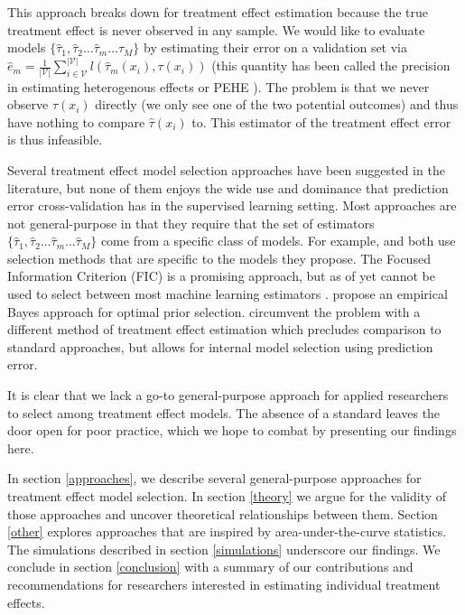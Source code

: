This approach breaks down for treatment effect estimation because the true treatment effect is never observed in any sample. We would like to evaluate models $\{\hat\tau_1, \hat\tau_2 \dots \hat \tau_m \dots \hat \tau_M\}$ by estimating their error on a validation set via $\hat e_m = \frac{1}{|\mathcal{V}|}\sum_{i \in \mathcal{V}}^{|\mathcal{V}|}  l(\hat \tau_m (x_i), \tau(x_i))$ (this quantity has been called the precision in estimating heterogenous effects or PEHE \cite{Hill2011}). The problem is that we never observe $\tau(x_i)$ directly (we only see one of the two potential outcomes) and thus have nothing to compare $\hat\tau(x_i)$ to. This estimator of the treatment effect error is thus infeasible.

Several treatment effect model selection approaches have been suggested in the literature, but none of them enjoys the wide use and dominance that prediction error cross-validation has in the supervised learning setting. Most approaches are not general-purpose in that they require that the set of estimators $\{\hat\tau_1, \hat\tau_2 \dots \hat \tau_m \dots \hat \tau_M\}$ come from a specific class of models. For example, \citet{Powers:2017wd} and \citet{Athey2015} both use selection methods that are specific to the models they propose. The Focused Information Criterion (FIC) \cite{Claeskens:2003ck} is a promising approach, but as of yet cannot be used to select between most machine learning estimators \cite{Jullum:2012uo}. \citet{Alaa:tj} propose an empirical Bayes approach for optimal prior selection. \citet{Nie:2017vi} circumvent the problem with a different method of treatment effect estimation which precludes comparison to standard approaches, but allows for internal model selection using prediction error. 

It is clear that we lack a go-to general-purpose approach for applied researchers to select among treatment effect models. The absence of a standard leaves the door open for poor practice, which we hope to combat by presenting our findings here.

In section \ref{approaches}, we describe several general-purpose approaches for treatment effect model selection. In section \ref{theory} we argue for the validity of those approaches and uncover theoretical relationships between them. Section \ref{other} explores approaches that are inspired by area-under-the-curve statistics. The simulations described in section \ref{simulations} underscore our findings. We conclude in section \ref{conclusion} with a summary of our contributions and recommendations for researchers interested in estimating individual treatment effects.

